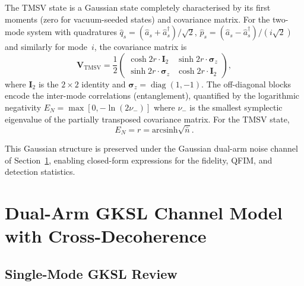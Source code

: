 \documentclass[journal]{IEEEtran}
\DeclareMathOperator{\diag}{diag}
\begin{document}
The TMSV state is a Gaussian state completely characterised by its first moments (zero for vacuum-seeded states) and covariance matrix. For the two-mode system with quadratures $\hat{q}_s = (\hat{a}_s + \hat{a}_s^\dagger)/\sqrt{2}$, $\hat{p}_s = (\hat{a}_s - \hat{a}_s^\dagger)/(i\sqrt{2})$ and similarly for mode~$i$, the covariance matrix is~\cite{weedbrook2012gaussian}
\begin{equation}\label{eq:tmsv_covariance}
\mathbf{V}_{\text{TMSV}} = \frac{1}{2}\begin{pmatrix}
\cosh 2r \cdot \mathbf{I}_2 & \sinh 2r \cdot \boldsymbol{\sigma}_z \\
\sinh 2r \cdot \boldsymbol{\sigma}_z & \cosh 2r \cdot \mathbf{I}_2
\end{pmatrix},
\end{equation}
where $\mathbf{I}_2$ is the $2\times 2$ identity and $\boldsymbol{\sigma}_z = \diag(1, -1)$. The off-diagonal blocks encode the inter-mode correlations (entanglement), quantified by the logarithmic negativity $E_N = \max[0, -\ln(2\nu_-)]$ where $\nu_-$ is the smallest symplectic eigenvalue of the partially transposed covariance matrix. For the TMSV state,
\begin{equation}\label{eq:log_negativity}
E_N = r = \text{arcsinh}\sqrt{\bar{n}}.
\end{equation}

This Gaussian structure is preserved under the Gaussian dual-arm noise channel of Section~\ref{sec:dual_gksl}, enabling closed-form expressions for the fidelity, QFIM, and detection statistics.

\section{Dual-Arm GKSL Channel Model with Cross-Decoherence}\label{sec:dual_gksl}

\subsection{Single-Mode GKSL Review}
\end{document}
